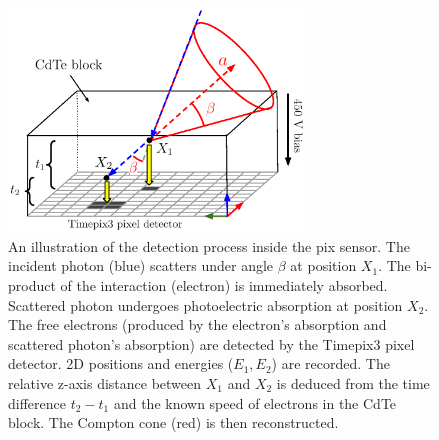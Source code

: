 \begin{figure}[!h]
    \centering
  \includegraphics[width=0.7\textwidth]{./fig/photos/my_minipix.eps}
    \caption{An illustration of the detection process inside the \ac{pix} sensor. 
    The incident photon (blue) scatters under angle $\beta$ at position $X_{1}$. 
    The bi-product of the interaction (electron) is immediately absorbed. 
    Scattered photon undergoes photoelectric absorption at position $X_{2}$. 
    The free electrons (produced by the electron's absorption and scattered photon's absorption) are detected by the Timepix3 pixel detector. 2D positions and energies ($E_{1}, E_{2}$) are recorded. 
    The relative z-axis distance between $X_{1}$ and $X_{2}$ is deduced from the time difference $t_{2}-t_{1}$ and the known speed of electrons in the \ac{CdTe} block.
    The Compton cone (red) is then reconstructed.}
    \label{fig:minipix}
\end{figure}

